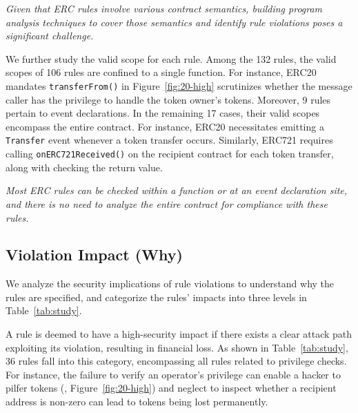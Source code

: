 {\it{
Given that ERC rules involve various contract semantics, building 
program analysis techniques to cover those semantics and identify rule violations 
poses a significant challenge.
}}

We further study the valid scope for each rule. 
Among the 132 rules, 
the valid scopes of 106 rules are confined to a single function. 
For instance, ERC20 mandates \texttt{transferFrom()} 
in Figure~\ref{fig:20-high} scrutinizes whether the message caller 
has the privilege to handle the token owner's tokens. 
Moreover, 9 rules pertain to event declarations. 
In the remaining 17 cases, 
their valid scopes encompass the entire contract. 
For instance, ERC20 necessitates emitting a \texttt{Transfer} event 
whenever a token transfer occurs. Similarly, ERC721 requires calling \texttt{onERC721Received()} on the recipient contract for each token transfer, 
along with checking the return value. %



{\it{
Most ERC rules can be checked within a function or at an event declaration site, and there is no need to analyze the entire contract for compliance with these rules. 
}}



\subsection{Violation Impact (Why)}

We analyze the security implications of rule violations to understand why the rules are specified, and categorize the rules' 
impacts into three levels in Table~\ref{tab:study}.



A rule is deemed to have a high-security impact if there exists a clear 
attack path exploiting its violation, 
resulting in financial loss. 
As shown in Table~\ref{tab:study}, 36 rules fall into this category, 
encompassing all rules related to privilege checks. 
For instance, the failure to verify an operator's privilege can enable a hacker to pilfer tokens (\eg, Figure~\ref{fig:20-high}) and neglect to inspect whether a recipient address
is non-zero can lead to tokens being lost permanently. 

